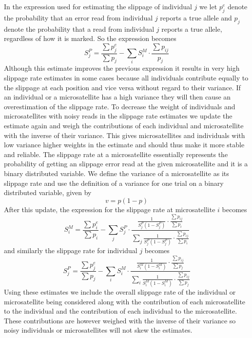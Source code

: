 \documentclass{bioinfo}
\begin{document}
\begin{methods}
\begin{equation}
\label{eq:sMjEq}
\end{equation}
In the expression used for estimating the slippage of individual $j$ we let $p^e_j$ denote the probability that an error read from individual $j$ reports a true allele and $p_j$ denote the probability that a read from individual $j$ reports a true allele, regardless of how it is marked. So the expression becomes 
\begin{equation}
S^{P}_j = \frac{\sum p^e_j}{\sum p_j} - 
\sum_i S^{M}_i \cdot \frac{\sum p_{ij}}{p_j}
\label{eq:sPjEq}
\end{equation}
Although this estimate improves the previous expression it results in very high slippage rate estimates in some cases because all individuals contribute equally to the slippage at each position and vice versa without regard to their variance. If an individual or a microsatellite has a high variance they will then cause an overestimation of the slippage rate.
To decrease the weight of individuals and microsatellites with noisy reads in the slippage rate estimates we update the estimate again and weigh the contributions of each individual and microsatellite with the inverse of their variance. This gives microsatellites and individuals with low variance higher weights in the estimate and should thus make it more stable and reliable. 
The slippage rate at a microsatellite essentially represents the probability of getting an slippage error read at the given microsatellite and it is a binary distributed variable. We define the variance of a microsatellite as its slippage rate and use the definition of a variance for one trial on a binary distributed variable, given by
\begin{equation}
v = p(1-p)
\end{equation}
After this update, the expression for the slippage rate at microsatellite $i$ becomes 
\begin{equation}
S^{M}_i = \frac{\sum p^e_i}{\sum p_i} - 
\sum_j S^{P}_j \cdot 
\frac{ \frac{1}{S^{P}_j(1-S^{P}_j)} \cdot \frac{\sum p_{ij}}{\sum p_i}}{\sum_j \frac{1}{S^{P}_j(1-S^{P}_j)} \cdot \frac{\sum p_{ij}}{\sum p_i}}
\label{eq:sMiEq2}
\end{equation}
and similarly the slippage rate for individual $j$ becomes 
\begin{equation}
S^{P}_j = \frac{\sum p^e_j}{\sum p_j} - 
\sum_i S^{M}_i \cdot
\frac{ \frac{1}{S^{M}_i(1-S^{M}_i)} \cdot \frac{\sum p_{ij}}{\sum p_j}}
{\sum_i \frac{1}{S^{M}_i(1-S^{M}_i)} \cdot \frac{\sum p_{ij}}{\sum p_j}}
\label{eq:sPjEq2}
\end{equation}
Using these estimates we include the overall slippage rate of the individual or microsatellite being considered along with the contribution of each microsatellite to the individual and the contribution of each individual to the microsatellite. These contributions are however weighed with the inverse of their variance so noisy individuals or microsatellites will not skew the estimates.


\end{methods}
\end{document}
